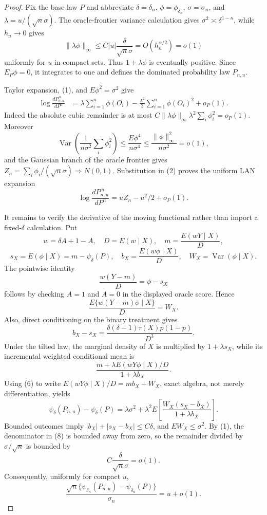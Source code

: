 \documentclass{article}
\begin{document}
\begin{proof}
Fix the base law \(P\) and abbreviate \(\delta=\delta_n\), \(\phi=\phi_{\delta_n}\), \(\sigma=\sigma_n\), and \(\lambda=u/(\sqrt n\sigma)\).  The oracle-frontier variance calculation gives \(\sigma^2\asymp\delta^{1-\kappa}\), while \(h_n\to0\) gives
\[
 \|\lambda\phi\|_\infty\leq C|u|\frac{\delta}{\sqrt n\sigma}
 =O(h_n^{\alpha/2})=o(1) \tag{1}
\]
uniformly for \(u\) in compact sets.  Thus \(1+\lambda\phi\) is eventually positive.  Since \(E_P\phi=0\), it integrates to one and defines the dominated probability law \(P_{n,u}\).

Taylor expansion, (1), and \(E\phi^2=\sigma^2\) give
\[
\begin{split}
 \log\frac{dP_{n,u}^{\,n}}{dP^n}
 &=\lambda\sum_{i=1}^n\phi(O_i)-\frac{\lambda^2}{2}\sum_{i=1}^n\phi(O_i)^2+o_P(1).
\end{split} \tag{2}
\]
Indeed the absolute cubic remainder is at most \(C\|\lambda\phi\|_\infty\lambda^2\sum_i\phi_i^2=o_P(1)\).  Moreover
\[
 \operatorname{Var}\!\left(\frac1{n\sigma^2}\sum_i\phi_i^2\right)
 \leq\frac{E\phi^4}{n\sigma^4}
 \leq\frac{\|\phi\|_\infty^2}{n\sigma^2}=o(1), \tag{3}
\]
and the Gaussian branch of the oracle frontier gives
\(Z_n=\sum_i\phi_i/(\sqrt n\sigma)\Rightarrow N(0,1)\).  Substitution in (2) proves the uniform LAN expansion
\[
 \log\frac{dP_{n,u}^{\,n}}{dP^n}=uZ_n-u^2/2+o_P(1). \tag{4}
\]

It remains to verify the derivative of the moving functional rather than import a fixed-\(\delta\) calculation.  Put
\[
 w=\delta A+1-A,\quad D=E(w\mid X),\quad m=\frac{E(wY\mid X)}D,
\]
\[
 s_X=E(\phi\mid X)=m-\psi_\delta(P),\quad
 b_X=\frac{E(w\phi\mid X)}D,\quad W_X=\operatorname{Var}(\phi\mid X).
\]
The pointwise identity
\[
 \frac{w(Y-m)}D=\phi-s_X \tag{5}
\]
follows by checking \(A=1\) and \(A=0\) in the displayed oracle score.  Hence
\[
 \frac{E\{w(Y-m)\phi\mid X\}}D=W_X. \tag{6}
\]
Also, direct conditioning on the binary treatment gives
\[
 b_X-s_X=\frac{\delta(\delta-1)\tau(X)p(1-p)}{D^3}. \tag{7}
\]
Under the tilted law, the marginal density of \(X\) is multiplied by \(1+\lambda s_X\), while its incremental weighted conditional mean is
\[
 \frac{m+\lambda E(wY\phi\mid X)/D}{1+\lambda b_X}.
\]
Using (6) to write \(E(wY\phi\mid X)/D=mb_X+W_X\), exact algebra, not merely differentiation, yields
\[
 \psi_\delta(P_{n,u})-\psi_\delta(P)
 =\lambda\sigma^2+\lambda^2E\!\left[\frac{W_X(s_X-b_X)}{1+\lambda b_X}\right]. \tag{8}
\]
Bounded outcomes imply \(|b_X|+|s_X-b_X|\leq C\delta\), and \(EW_X\leq\sigma^2\).  By (1), the denominator in (8) is bounded away from zero, so the remainder divided by \(\sigma/\sqrt n\) is bounded by
\[
 C\frac{\delta}{\sqrt n\sigma}=o(1). \tag{9}
\]
Consequently, uniformly for compact \(u\),
\[
 \frac{\sqrt n\{\psi_{\delta_n}(P_{n,u})-\psi_{\delta_n}(P)\}}{\sigma_n}=u+o(1). \tag{10}
\]


\end{proof}
\end{document}
